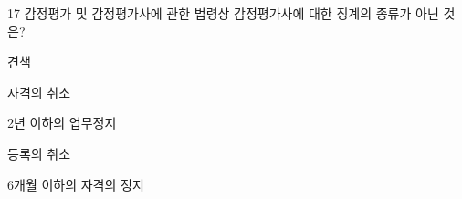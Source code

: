\begin{question}{17}
감정평가 및 감정평가사에 관한 법령상 감정평가사에 대한 징계의 종류가 아닌 것은?
\begin{choices}
  \item 견책
  \item 자격의 취소
  \item 2년 이하의 업무정지
  \item 등록의 취소
  \item 6개월 이하의 자격의 정지
\end{choices}
\end{question}
